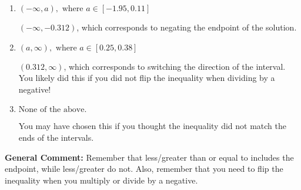 \documentclass{extbook}[14pt]
\begin{document}
\begin{enumerate}
{\begin{enumerate}[label=\Alph*.]
* $(-\infty, 0.312)$, which is the correct option.
\item \( (-\infty, a), \text{ where } a \in [-1.95, 0.11] \)

 $(-\infty, -0.312)$, which corresponds to negating the endpoint of the solution.
\item \( (a, \infty), \text{ where } a \in [0.25, 0.38] \)

 $(0.312, \infty)$, which corresponds to switching the direction of the interval. You likely did this if you did not flip the inequality when dividing by a negative!
\item \( \text{None of the above}. \)

You may have chosen this if you thought the inequality did not match the ends of the intervals.
\end{enumerate}

\textbf{General Comment:} Remember that less/greater than or equal to includes the endpoint, while less/greater do not. Also, remember that you need to flip the inequality when you multiply or divide by a negative.
}
\end{enumerate}
\end{document}
